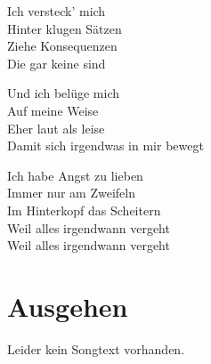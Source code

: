 \documentclass[]{book}
\begin{document}
Ich versteck' mich\\
Hinter klugen Sätzen\\
Ziehe Konsequenzen\\
Die gar keine sind

Und ich belüge mich\\
Auf meine Weise\\
Eher laut als leise\\
Damit sich irgendwas in mir bewegt

Ich habe Angst zu lieben\\
Immer nur am Zweifeln\\
Im Hinterkopf das Scheitern\\
Weil alles irgendwann vergeht\\
Weil alles irgendwann vergeht

\hypertarget{ausgehen}{%
\section{Ausgehen}\label{ausgehen}}

Leider kein Songtext vorhanden.
\end{document}
